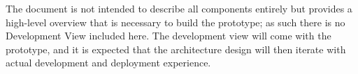 \documentclass[a4paper,11pt]{esiwace-modified}
\begin{document}
The document is not intended to describe all components entirely but provides a high-level overview that is necessary to build the prototype; as such there is no Development View included here.
The development view will come with the prototype, and it is expected that the architecture design will then iterate with actual development and deployment experience.











%

\label{sec:references}




\end{document}
